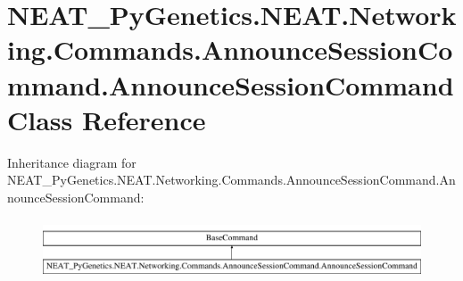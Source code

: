 \hypertarget{class_n_e_a_t___py_genetics_1_1_n_e_a_t_1_1_networking_1_1_commands_1_1_announce_session_command_1_1_announce_session_command}{}\section{N\+E\+A\+T\+\_\+\+Py\+Genetics.\+N\+E\+A\+T.\+Networking.\+Commands.\+Announce\+Session\+Command.\+Announce\+Session\+Command Class Reference}
\label{class_n_e_a_t___py_genetics_1_1_n_e_a_t_1_1_networking_1_1_commands_1_1_announce_session_command_1_1_announce_session_command}
Inheritance diagram for N\+E\+A\+T\+\_\+\+Py\+Genetics.\+N\+E\+A\+T.\+Networking.\+Commands.\+Announce\+Session\+Command.\+Announce\+Session\+Command\+:\begin{figure}[H]
\begin{center}
\leavevmode
\includegraphics[height=1.821138cm]{class_n_e_a_t___py_genetics_1_1_n_e_a_t_1_1_networking_1_1_commands_1_1_announce_session_command_1_1_announce_session_command}
\end{center}
\end{figure}
